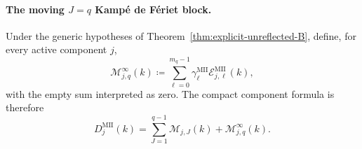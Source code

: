 \documentclass[10pt]{amsart}
\theoremstyle{plain}
\theoremstyle{definition}
\theoremstyle{remark}
\begin{document}
\paragraph{The moving \(J=q\) Kamp\'e de F\'eriet block.}
Under the generic hypotheses of
Theorem~\ref{thm:explicit-unreflected-B}, define, for every active
component \(j\),
\begin{equation}
 \mathscr M_{j,q}^{\infty}(k)
 \coloneq
 \sum_{\ell=0}^{m_q-1}
 \gamma_\ell^{\mathrm{MII}}
 \mathcal E_{j,\ell}^{\mathrm{MII}}(k),
 \label{eq:MII-moving-block-definition}
\end{equation}
with the empty sum interpreted as zero.  The compact component formula is
therefore
\begin{equation}
 D_j^{\mathrm{MII}}(k)
 =\sum_{J=1}^{q-1}\mathscr M_{j,J}(k)
  +\mathscr M_{j,q}^{\infty}(k).
 \label{eq:MII-all-sector-components}
\end{equation}
\end{document}
